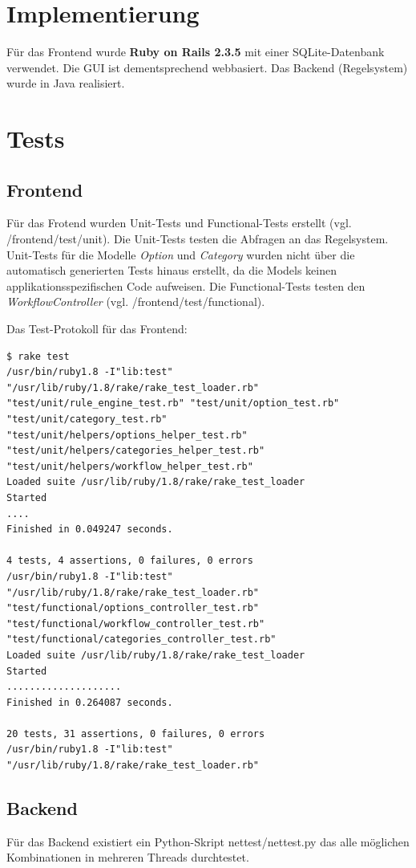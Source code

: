 \documentclass[a4paper,10pt]{article}
\begin{document}
\section{Implementierung}

Für das Frontend wurde \textbf{Ruby on Rails 2.3.5} mit einer SQLite-Datenbank verwendet.
Die GUI ist dementsprechend webbasiert.
Das Backend (Regelsystem) wurde in Java realisiert. 

\section{Tests}

\subsection{Frontend}

Für das Frotend wurden Unit-Tests und Functional-Tests erstellt (vgl. /frontend/test/unit).
Die Unit-Tests testen die Abfragen an das Regelsystem.
Unit-Tests für die Modelle \textit{Option} und \textit{Category} wurden nicht über die automatisch generierten Tests hinaus erstellt, da die Models keinen applikationsspezifischen Code aufweisen.
Die Functional-Tests testen den \textit{WorkflowController} (vgl. /frontend/test/functional).

Das Test-Protokoll für das Frontend:

\begin{lstlisting}
$ rake test
/usr/bin/ruby1.8 -I"lib:test" "/usr/lib/ruby/1.8/rake/rake_test_loader.rb" "test/unit/rule_engine_test.rb" "test/unit/option_test.rb" "test/unit/category_test.rb" "test/unit/helpers/options_helper_test.rb" "test/unit/helpers/categories_helper_test.rb" "test/unit/helpers/workflow_helper_test.rb" 
Loaded suite /usr/lib/ruby/1.8/rake/rake_test_loader
Started
....
Finished in 0.049247 seconds.

4 tests, 4 assertions, 0 failures, 0 errors
/usr/bin/ruby1.8 -I"lib:test" "/usr/lib/ruby/1.8/rake/rake_test_loader.rb" "test/functional/options_controller_test.rb" "test/functional/workflow_controller_test.rb" "test/functional/categories_controller_test.rb" 
Loaded suite /usr/lib/ruby/1.8/rake/rake_test_loader
Started
....................
Finished in 0.264087 seconds.

20 tests, 31 assertions, 0 failures, 0 errors
/usr/bin/ruby1.8 -I"lib:test" "/usr/lib/ruby/1.8/rake/rake_test_loader.rb"  
\end{lstlisting}

\subsection{Backend}
Für das Backend existiert ein Python-Skript nettest/nettest.py das alle möglichen Kombinationen in mehreren Threads durchtestet.
\end{document}
